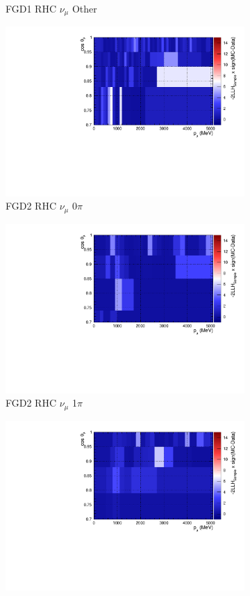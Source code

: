 \begin{figure}[!htbp]
\begin{subfigure}{.32\textwidth}
  \caption{FGD1 RHC $\nu_{\mu}$ Other}
  \label{fig:llhcont_FGD1_NuMuBkg_CCOther_in_AntiNu_Mode}
\end{subfigure}
\begin{subfigure}{.32\textwidth}
  \centering
  \includegraphics[width=0.85\linewidth]{figs/llhcont_Poly574_FGD2_NuMuBkg_CC0pi_in_AntiNu_Mode.pdf}
  \caption{FGD2 RHC $\nu_{\mu}$ 0$\pi$}
  \label{fig:llhcont_FGD2_NuMuBkg_CC0pi_in_AntiNu_Mode}
\end{subfigure}
\begin{subfigure}{.32\textwidth}
  \centering
  \includegraphics[width=0.85\linewidth]{figs/llhcont_Poly574_FGD2_NuMuBkg_CC1pi_in_AntiNu_Mode.pdf}
  \caption{FGD2 RHC $\nu_{\mu}$ 1$\pi$}
  \label{fig:llhcont_FGD2_NuMuBkg_CC1pi_in_AntiNu_Mode}
\end{subfigure}
\begin{subfigure}{.32\textwidth}
  \centering
  \includegraphics[width=0.85\linewidth]{figs/llhcont_Poly574_FGD2_NuMuBkg_CCOther_in_AntiNu_Mode.pdf}

\end{subfigure}
\end{figure}
